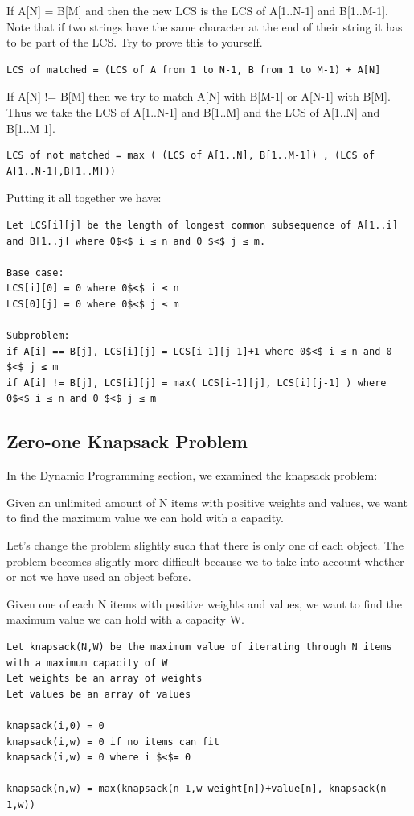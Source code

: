 \documentclass[11pt,oneside]{book}
\begin{document}
If A[N] = B[M] and then the new LCS is the LCS of A[1..N-1] and B[1..M-1]. Note that if two strings have the same character at the end of their string it has to be part of the LCS. Try to prove this to yourself.

\begin{lstlisting}
LCS of matched = (LCS of A from 1 to N-1, B from 1 to M-1) + A[N]
\end{lstlisting}

If A[N] != B[M] then we try to match A[N] with B[M-1] or A[N-1] with B[M]. Thus we take the LCS of A[1..N-1] and B[1..M] and the LCS of A[1..N] and B[1..M-1].

\begin{lstlisting}
LCS of not matched = max ( (LCS of A[1..N], B[1..M-1]) , (LCS of A[1..N-1],B[1..M]))
\end{lstlisting}

Putting it all together we have:

\begin{lstlisting}
Let LCS[i][j] be the length of longest common subsequence of A[1..i] and B[1..j] where 0$<$ i ≤ n and 0 $<$ j ≤ m.

Base case:
LCS[i][0] = 0 where 0$<$ i ≤ n
LCS[0][j] = 0 where 0$<$ j ≤ m

Subproblem:
if A[i] == B[j], LCS[i][j] = LCS[i-1][j-1]+1 where 0$<$ i ≤ n and 0 $<$ j ≤ m
if A[i] != B[j], LCS[i][j] = max( LCS[i-1][j], LCS[i][j-1] ) where 0$<$ i ≤ n and 0 $<$ j ≤ m
\end{lstlisting}

\subsection{Zero-one Knapsack Problem}

In the Dynamic Programming section, we examined the knapsack problem:

Given an unlimited amount of N items with positive weights and values, we want to find the maximum value we can hold with a capacity.

Let's change the problem slightly such that there is only one of each object. The problem becomes slightly more difficult because we to take into account whether or not we have used an object before.

Given one of each N items with positive weights and values, we want to find the maximum value we can hold with a capacity W.

\begin{lstlisting}
Let knapsack(N,W) be the maximum value of iterating through N items with a maximum capacity of W
Let weights be an array of weights
Let values be an array of values

knapsack(i,0) = 0
knapsack(i,w) = 0 if no items can fit
knapsack(i,w) = 0 where i $<$= 0

knapsack(n,w) = max(knapsack(n-1,w-weight[n])+value[n], knapsack(n-1,w))
\end{lstlisting}
\end{document}
